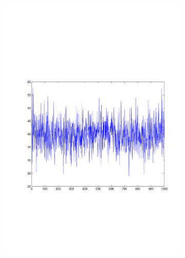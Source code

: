\begin{figure}
\begin{subfigure}[c]{0.5\textwidth}
	\includegraphics[trim = 25mm 75mm 15mm 90mm, clip, width=\textwidth]{matlab/statfig_10}
\end{subfigure}
\begin{subfigure}[c]{0.5\textwidth}

\end{subfigure}
\end{figure}
